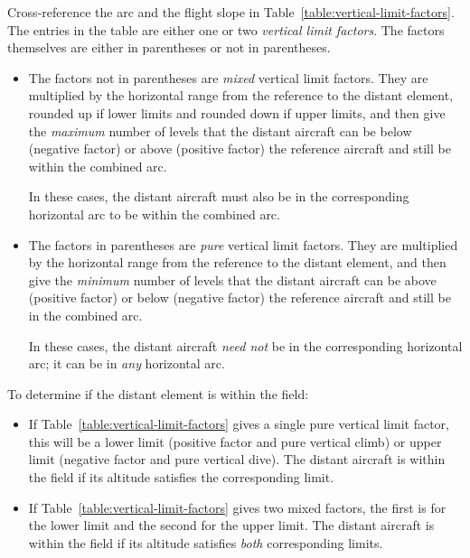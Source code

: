 {Cross-reference the arc and the flight slope in Table~\ref{table:vertical-limit-factors}. The entries in the table are either one or two \emph{vertical limit factors}. The factors themselves are either in parentheses or not in parentheses.

\begin{itemize}

\item
The factors not in parentheses are \emph{mixed} vertical limit factors. They are multiplied by the horizontal range from the reference to the distant element, rounded up if lower limits and rounded down if upper limits, and then give the \emph{maximum} number of levels that the distant aircraft can be below (negative factor) or above (positive factor) the reference aircraft and still be within the combined arc. 

In these cases, the distant aircraft must also be in the corresponding horizontal arc to be within the combined arc.

\item
The factors in parentheses are \emph{pure} vertical limit factors. They are multiplied by the horizontal range from the reference to the distant element, and then give the \emph{minimum} number of levels that the distant aircraft can be above (positive factor) or below (negative factor) the reference aircraft and still be in the combined arc. 

In these cases, the distant aircraft \emph{need not} be in the corresponding horizontal arc; it can be in \emph{any} horizontal arc.

\end{itemize}

To determine if the distant element is within the field:

\begin{itemize}
\item 
If Table~\ref{table:vertical-limit-factors} gives a single pure vertical limit factor, this will be a lower limit (positive factor and pure vertical climb) or upper limit (negative factor and pure vertical dive). The distant aircraft is within the field if its altitude satisfies the corresponding limit.

\item 
If Table~\ref{table:vertical-limit-factors} gives two mixed factors, the first is for the lower limit and the second for the upper limit. The distant aircraft is within the field if its altitude satisfies \emph{both} corresponding limits.


\end{itemize}}
